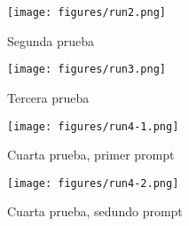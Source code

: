 \documentclass[12pt]{article}
\begin{document}
\begin{figure}[ht]
  \centering
  \texttt{[image: figures/run2.png]}
  \caption{Segunda prueba}
\end{figure}

\begin{figure}[ht]
  \centering
  \texttt{[image: figures/run3.png]}
  \caption{Tercera prueba}
\end{figure}

\begin{figure}[ht]
  \centering
  \texttt{[image: figures/run4-1.png]}
  \caption{Cuarta prueba, primer prompt}
\end{figure}

\begin{figure}[ht]
  \centering
  \texttt{[image: figures/run4-2.png]}
  \caption{Cuarta prueba, sedundo prompt}
\end{figure}
\end{document}

